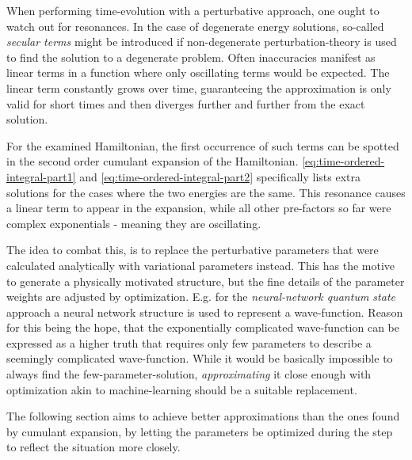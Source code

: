When performing time-evolution with a perturbative approach, one ought to watch out for resonances.
In the case of degenerate energy solutions, so-called \emph{secular terms} \cite{secularTermsPerturbation} might be introduced if non-degenerate perturbation-theory is used to find the solution to a degenerate problem. 
Often inaccuracies manifest as linear terms in a function where only oscillating terms would be expected.
The linear term constantly grows over time, guaranteeing the approximation is only valid for short times and then diverges further and further from the exact solution.

For the examined Hamiltonian, the first occurrence of such terms can be spotted in the second order cumulant expansion of the Hamiltonian.
\autoref{eq:time-ordered-integral-part1} and \autoref{eq:time-ordered-integral-part2} specifically lists extra solutions for the cases where the two energies are the same.
This resonance causes a linear term to appear in the expansion, while all other pre-factors so far were complex exponentials - meaning they are oscillating.

The idea to combat this, is to replace the perturbative parameters that were calculated analytically with variational parameters instead.
This has the motive to generate a physically motivated structure, but the fine details of the parameter weights are adjusted by optimization.
E.g. for the \emph{neural-network quantum state} \cite{neuralNetworkQuantumStates} approach a neural network structure is used to represent a wave-function.
Reason for this being the hope, that the exponentially complicated wave-function can be expressed as a \glqq higher truth\grqq{} that requires only few parameters to describe a seemingly complicated wave-function.
While it would be basically impossible to always find the few-parameter-solution, \emph{approximating} it close enough with optimization akin to machine-learning should be a suitable replacement.

The following section aims to achieve better approximations than the ones found by cumulant expansion, by letting the parameters be optimized during the step to reflect the situation more closely.